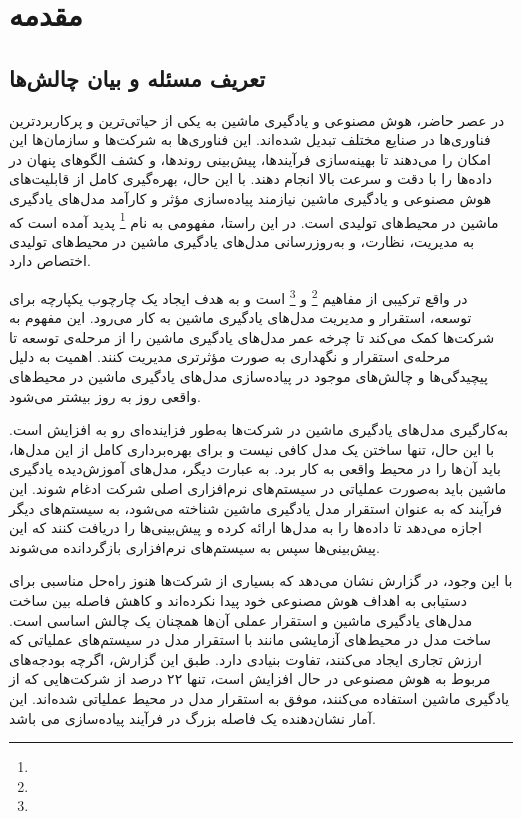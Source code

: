 \chapter{مقدمه} \label{ch:Introduction}

\section{تعریف مسئله و بیان چالش‌ها}
در عصر حاضر، هوش مصنوعی و یادگیری ماشین به یکی از حیاتی‌ترین و پرکاربردترین فناوری‌ها در صنایع مختلف تبدیل شده‌اند. این فناوری‌ها به شرکت‌ها و سازمان‌ها این امکان را می‌دهند تا بهینه‌سازی فرآیندها، پیش‌بینی روندها، و کشف الگوهای پنهان در داده‌ها را با دقت و سرعت بالا انجام دهند. با این حال، بهره‌گیری کامل از قابلیت‌های هوش مصنوعی و یادگیری ماشین نیازمند پیاده‌سازی مؤثر و کارآمد مدل‌های یادگیری ماشین در محیط‌های تولیدی است. در این راستا، مفهومی به نام \footnote{} پدید آمده است که به مدیریت، نظارت، و به‌روزرسانی مدل‌های یادگیری ماشین در محیط‌های تولیدی اختصاص دارد.

در واقع ترکیبی از مفاهیم \footnote{} و \footnote{} است و به هدف ایجاد یک چارچوب یکپارچه برای توسعه، استقرار و مدیریت مدل‌های یادگیری ماشین به کار می‌رود. این مفهوم به شرکت‌ها کمک می‌کند تا چرخه عمر مدل‌های یادگیری ماشین را از مرحله‌ی توسعه تا مرحله‌ی استقرار و نگهداری به صورت مؤثرتری مدیریت کنند. اهمیت  به دلیل پیچیدگی‌ها و چالش‌های موجود در پیاده‌سازی مدل‌های یادگیری ماشین در محیط‌های واقعی روز به روز بیشتر می‌شود.

به‌کارگیری مدل‌های یادگیری ماشین در شرکت‌ها به‌طور فزاینده‌ای رو به افزایش است. با این حال، تنها ساختن یک مدل کافی نیست و برای بهره‌برداری کامل از این مدل‌ها، باید آن‌ها را در محیط واقعی به کار برد. به عبارت دیگر، مدل‌های آموزش‌دیده یادگیری ماشین باید به‌صورت عملیاتی در سیستم‌های نرم‌افزاری اصلی شرکت ادغام شوند. این فرآیند که به عنوان استقرار مدل یادگیری ماشین شناخته می‌شود، به سیستم‌های دیگر اجازه می‌دهد تا داده‌ها را به مدل‌ها ارائه کرده و پیش‌بینی‌ها را دریافت کنند که این پیش‌بینی‌ها سپس به سیستم‌های نرم‌افزاری بازگردانده می‌شوند.

با این وجود،  در گزارش \cite{algorithmiaMLState} نشان می‌دهد که بسیاری از شرکت‌ها هنوز راه‌حل مناسبی برای دستیابی به اهداف هوش مصنوعی خود پیدا نکرده‌اند و کاهش فاصله بین ساخت مدل‌های یادگیری ماشین و استقرار عملی آن‌ها همچنان یک چالش اساسی است. ساخت مدل در محیط‌های آزمایشی مانند  با استقرار مدل در سیستم‌های عملیاتی که ارزش تجاری ایجاد می‌کنند، تفاوت بنیادی دارد. طبق این گزارش، اگرچه بودجه‌های مربوط به هوش مصنوعی در حال افزایش است، تنها ۲۲ درصد از شرکت‌هایی که از یادگیری ماشین استفاده می‌کنند، موفق به استقرار مدل در محیط عملیاتی شده‌اند. این آمار نشان‌دهنده یک فاصله بزرگ در فرآیند پیاده‌سازی می باشد.

